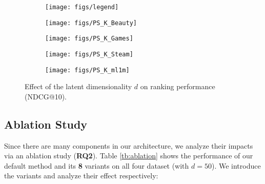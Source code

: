 \documentclass[conference]{IEEEtran}
\begin{document}
\begin{figure*}
\centering
\begin{subfigure}[b]{\textwidth}
\centering
\texttt{[image: figs/legend]}
\end{subfigure}
\begin{subfigure}[b]{0.245\textwidth}
\texttt{[image: figs/PS\_K\_Beauty]}
\end{subfigure}
\begin{subfigure}[b]{0.245\textwidth}
\texttt{[image: figs/PS\_K\_Games]}
\end{subfigure}
\begin{subfigure}[b]{0.245\textwidth}
\texttt{[image: figs/PS\_K\_Steam]}
\end{subfigure}
\begin{subfigure}[b]{0.245\textwidth}
\texttt{[image: figs/PS\_K\_ml1m]}
\end{subfigure}
\caption{Effect of the latent dimensionality $d$ on ranking performance (NDCG@10).
}
\label{fig:K}
\end{figure*}  



\subsection{Ablation Study}

Since there are many components in our architecture, we analyze their impacts via an ablation study (\textbf{RQ2}). Table \ref{tb:ablation} shows the performance of our default method and its \textbf{8} variants on all four dataset (with $d=50$). We introduce the variants and analyze their effect respectively:
\end{document}
